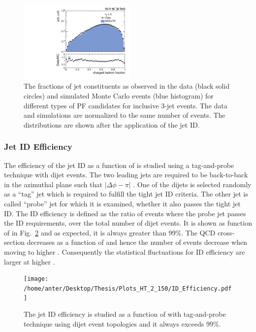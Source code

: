 \begin{figure}[!htbp]
\begin{center}
 \vspace*{1mm}
 \includegraphics[width=0.51\textwidth]{Plots_HT_2_150/Comparison_ChHadFrac_3_HT_2_150.pdf}
 \caption[The fractions of jet constituents for different types of PF candidates for inclusive 3-jet events.]{The fractions of jet constituents as observed in the data (black solid circles) and simulated Monte Carlo events (blue histogram) for different types of PF candidates for inclusive 3-jet events. The data and simulations are normalized to the same number of events. The distributions are shown after the application of the jet ID.}
 \label{fig:qual3}
 \end{center}
\end{figure} 

\subsubsection{Jet ID Efficiency}
The efficiency of the jet ID as a function of \httwo is studied using a tag-and-probe technique with dijet events. The two leading jets are required to be back-to-back in the azimuthal plane such that $|\Delta\phi - \pi|$ . One of the dijets is selected randomly as a ``tag'' jet which is required to fulfill the tight jet ID criteria. The other jet is called ``probe'' jet for which it is examined, whether it also passes the tight jet ID. The ID efficiency is defined as the ratio of events where the probe jet passes the ID requirements, over the total number of dijet events. It is shown as function of \httwo in Fig.~\ref{fig:ideff} and as expected, it is always greater than 99\%. The QCD cross-section decreases as a function of \httwo and hence the number of events decrease when moving to higher \httwons. Consequently the statistical fluctuations for ID efficiency are larger at higher \httwons.

\begin{figure}[!htbp]
 \begin{center}
 \texttt{[image: /home/anter/Desktop/Thesis/Plots\_HT\_2\_150/ID\_Efficiency.pdf]}
 \caption[The jet ID efficiency is studied as a function of \httwo with tag-and-probe technique using dijet event topologies and it always exceeds 99\%.]{The jet ID efficiency is studied as a function of \httwo with tag-and-probe technique using dijet event topologies and it always exceeds 99\%.}
 \label{fig:ideff}
 \end{center}
\end{figure} 

